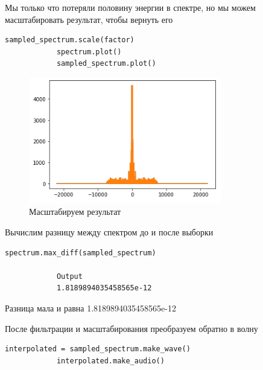 \documentclass[a4paper,12pt]{article}
\begin{document}
\begin{enumerate}
		Мы только что потеряли половину энергии в спектре, но мы можем масштабировать результат, чтобы вернуть его
		\begin{lstlisting}[caption=Масштабируем результат]
			sampled_spectrum.scale(factor)
			spectrum.plot()
			sampled_spectrum.plot()
		\end{lstlisting}
		\begin{figure}[H]
			\centering
			\includegraphics[width=0.75\textwidth]{3_6.png}
			\caption{Масштабируем результат}
			\label{fig:3.6}
		\end{figure}
	
		Вычислим разницу между спектром до и после выборки
		\begin{lstlisting}[caption=Вычисляем разницу]
			spectrum.max_diff(sampled_spectrum)
			
			Output
			1.8189894035458565e-12
		\end{lstlisting}
		
		Разница мала и равна 1.8189894035458565e-12
		
		После фильтрации и масштабирования преобразуем обратно в волну
		\begin{lstlisting}[caption=Обратно в волну]
			interpolated = sampled_spectrum.make_wave()
			interpolated.make_audio()
		\end{lstlisting}
		

\end{enumerate}
\end{document}
